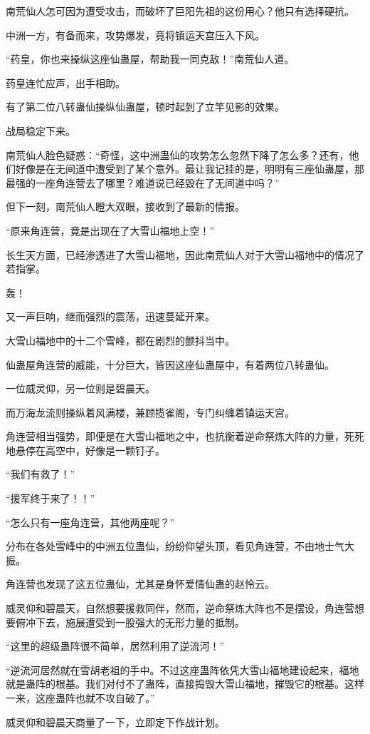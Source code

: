 \begin{this_body}
南荒仙人怎可因为遭受攻击，而破坏了巨阳先祖的这份用心？他只有选择硬抗。

中洲一方，有备而来，攻势爆发，竟将镇运天宫压入下风。

“药皇，你也来操纵这座仙蛊屋，帮助我一同克敌！”南荒仙人道。

药皇连忙应声，出手相助。

有了第二位八转蛊仙操纵仙蛊屋，顿时起到了立竿见影的效果。

战局稳定下来。

南荒仙人脸色疑惑：“奇怪，这中洲蛊仙的攻势怎么忽然下降了怎么多？还有，他们好像是在无间道中遭受到了某个意外。最让我记挂的是，明明有三座仙蛊屋，那最强的一座角连营去了哪里？难道说已经毁在了无间道中吗？”

但下一刻，南荒仙人瞪大双眼，接收到了最新的情报。

“原来角连营，竟是出现在了大雪山福地上空！”

长生天方面，已经渗透进了大雪山福地，因此南荒仙人对于大雪山福地中的情况了若指掌。

轰！

又一声巨响，继而强烈的震荡，迅速蔓延开来。

大雪山福地中的十二个雪峰，都在剧烈的颤抖当中。

仙蛊屋角连营的威能，十分巨大，皆因这座仙蛊屋中，有着两位八转蛊仙。

一位威灵仰，另一位则是碧晨天。

而万海龙流则操纵着风满楼，兼顾揽雀阁，专门纠缠着镇运天宫。

角连营相当强势，即便是在大雪山福地之中，也抗衡着逆命祭炼大阵的力量，死死地悬停在高空中，好像是一颗钉子。

“我们有救了！”

“援军终于来了！！”

“怎么只有一座角连营，其他两座呢？”

分布在各处雪峰中的中洲五位蛊仙，纷纷仰望头顶，看见角连营，不由地士气大振。

角连营也发现了这五位蛊仙，尤其是身怀爱情仙蛊的赵怜云。

威灵仰和碧晨天，自然想要援救同伴，然而，逆命祭炼大阵也不是摆设，角连营想要俯冲下去，施展遭受到一股强大的无形力量的抵制。

“这里的超级蛊阵很不简单，居然利用了逆流河！”

“逆流河居然就在雪胡老祖的手中。不过这座蛊阵依凭大雪山福地建设起来，福地就是蛊阵的根基。我们对付不了蛊阵，直接捣毁大雪山福地，摧毁它的根基。这样一来，这座蛊阵也就不攻自破了。”

威灵仰和碧晨天商量了一下，立即定下作战计划。


\end{this_body}

